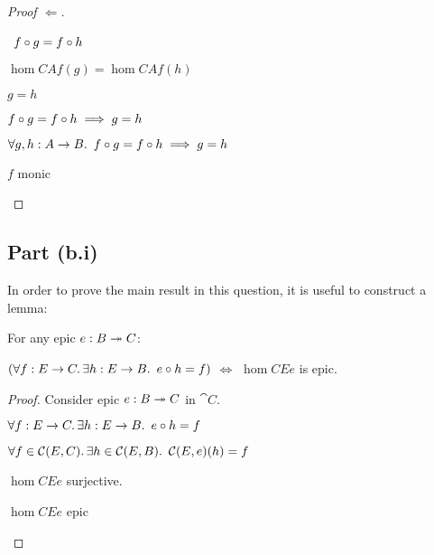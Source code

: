 \begin{prop}
\begin{proof}[Proof $\Leftarrow$]
\begin{itemize}
\begin{itemize}
          \step
            \begin{itemize}
            \subp{\dagger}
              \Ass~$f\compose g = f\compose h$
              \marginnote{\Hyp}

            \step[\iffs] $\hom{C}{A}{f}(g) = \hom{C}{A}{f}(h)$
              \marginnote{\Def-\ref{def:co-hom}}

            \step[\imps] $g = h$
            \end{itemize}

          \step[\imps] $f\compose g = f\compose h \implies g = h$
            \marginnote{$\imps$-\Intro}
        \end{itemize}
      \step[\imps] $\forall g, h : A \to B\ldotp~f\compose g = f\compose h \implies g = h$
        \marginnote{$\forall$-\Intro}

      \step[\iffs] $f$ monic
        \qedhere
    \end{itemize}
  \end{proof}
\end{prop}

\subsection{Part (b.i)}\label{sec:q-1-b-i}

In order to prove the main result in this question, it is useful to construct a lemma:

\begin{lemma}\label{lemma:epic-preserve-1}
  For any epic $e : B \epic C$:

  $(\forall f : E\to C\ldotp\exists h : E\to B\ldotp~e\compose h = f)$
  $\iff$ $\hom{C}{E}{e}$ is epic.

  \begin{proof}
    Consider epic $e : B \epic C$ in $\cat{C}$.
    \begin{itemize}
      \step $\forall f : E\to C\ldotp\exists h : E\to B\ldotp~e\compose h = f$
        \marginnote{\Hyp}
      \step[\iffs]

    $\forall f \in\hom{C}{E}{C}\ldotp\exists h\in\hom{C}{E}{B}\ldotp~\hom{C}{E}{e}(h) = f$
        \marginnote{\Def~\ref{def:hom-set}}

      \step[\iffs]
        $\hom{C}{E}{e}$ surjective.

      \step[\iffs]
        $\hom{C}{E}{e}$ epic
        \qedhere

    \end{itemize}
  \end{proof}
\end{lemma}

